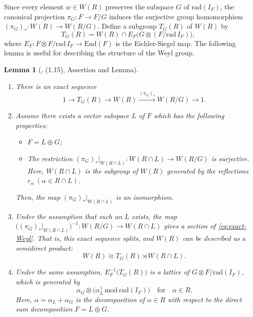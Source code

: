 \documentclass[11pt]{amsart}
\newtheorem{lemma}[thm]{Lemma}%
\begin{document}
{Since every element $w\in W(R)$ preserves the subspace $G$ of 
$\mathrm{rad}(I_F)$, the 
canonical projection $\pi_G: F\to F/G$ induces the surjective group homomorphism
$(\pi_G)_*:W(R)\to W(R/G)$. Define a subgroup $T_G(R)$ of $W(R)$ by
\begin{equation}
T_G(R)=W(R)\cap E_F\big(G\otimes (F/\mathrm{rad}\, I_F)\big),
\end{equation}
where $E_F:F\otimes F/\mathrm{rad}\, I_F\to \mathrm{End} (F)
$ is the 
Eichler-Siegel map. The following lemma is useful for describing the structure
of the Weyl group. 

\begin{lemma}[\cite{Saito1985}, (1.15), Assertion and Lemma]
\label{lemma:Saito(1.15)} 
\begin{enumerate}
\item There is an exact sequence
\begin{equation}\label{eq:exact-Weyl}
1 \longrightarrow T_G(R)\longrightarrow W(R) \xrightarrow{(\pi_G)_*} W(R/G) 
\longrightarrow 1.
\end{equation}
\item Assume there exists a vector subspace $L$ of $F$ which has 
the following properties{\rm :}
\begin{itemize}
\item[(i)] $F=L\oplus G${\rm ;}
\item[(ii)] The restriction $(\pi_G)_*\big|_{W(R\cap L)}:W(R\cap L)\to W(R/G)$ is 
surjective. Here, $W(R\cap L)$ is the subgroup of $W(R)$
generated by the reflections $r_\alpha\ (\alpha\in R\cap L)$.
\end{itemize}
Then, the map $(\pi_G)_*\big|_{W(R\cap L)}$ is an isomorphism. 
\vskip 1mm
\noindent
\item Under the assumption that such an $L$ exists, 
the map $\big((\pi_G)_*\big|_{W(R\cap L)}\big)^{-1}:W(R/G)\to W(R\cap L)$
gives a section of \eqref{eq:exact-Weyl}. That is, this exact sequence splits, and
 $W(R)$ can be described as a semidirect product{\rm :}
\begin{equation}
W(R)\cong T_G(R)\rtimes W(R\cap L).
\end{equation}
\vskip 1mm
\noindent
\item Under the same assumption, $E_F^{-1}\big(T_G(R)\big)$ is a lattice of 
$G\otimes F/\mathrm{rad}(I_F)$, which is generated by
\begin{equation}
\alpha_G\otimes \big(\alpha_L^\vee\, \mathrm{mod}\, \mathrm{rad}(I_F)\big)\quad\text{for}\quad \alpha\in R.
\end{equation} 
Here, $\alpha=\alpha_L+\alpha_G$ is the decomposition of $\alpha\in R$ with 
respect to the direct sum decomposition $F=L\oplus G$.
\end{enumerate}
\end{lemma}

}
\end{document}
